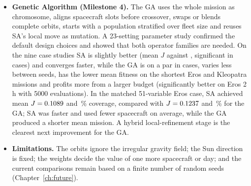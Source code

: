 \begin{itemize}
spacecraft simulations, so \ac{SA} is also two to four times faster per evaluation than random search.
\item \textbf{Genetic Algorithm (Milestone 4).} The \ac{GA} uses the whole mission as chromosome,
aligns spacecraft slots before crossover, swaps or blends complete orbits, starts with a population
stratified over fleet size and reuses \ac{SA}'s local move as mutation. A 23-setting parameter study
confirmed the default design choices and showed that both operator families are needed. On the
nine case studies \ac{SA} is slightly better (mean $J$ \saMeanJ{} against \gaMeanJ, significant in
\saWins{} cases) and converges faster, while the \ac{GA} is on a par in \gaTies{} cases, varies less
between seeds, has the lower mean fitness on the shortest Eros and Kleopatra missions and profits
more from a larger budget
(significantly better on Eros 2\,h with 5000 evaluations). In the matched 51-variable Eros case,
\ac{SA} achieved mean $J=0.1089$ and \saMatchedC\,\% coverage, compared with $J=0.1237$ and
\gaMatchedC\,\% for the \ac{GA}; \ac{SA} was faster and used fewer spacecraft on average, while the
\ac{GA} produced a shorter mean mission. A hybrid local-refinement stage is the clearest next improvement for the \ac{GA}.
\item \textbf{Limitations.} The orbits ignore the irregular gravity field; the Sun direction is fixed;
the weights decide the value of one more spacecraft or day; and the current comparisons remain based
on a finite number of random seeds
(Chapter~\ref{ch:future}).
\end{itemize}
